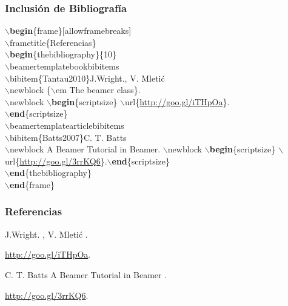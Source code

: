 \documentclass[aspectratio=43]{beamer}%
\begin{document}
\begin{frame}[fragile]
\frametitle{\textbf{Inclusión de Bibliografía}}
\justifying

$\backslash$\textbf{begin}\{frame\}[allowframebreaks]\\
$\backslash$frametitle\{Referencias\} \\
$\backslash$\textbf{begin}\{thebibliography\}\{10\}\\
$\backslash$beamertemplatebookbibitems\\
$\backslash$bibitem\{Tantau2010\}J.Wright., V. Mleti\'c\\
$\backslash$newblock \{$\backslash$em The beamer class\}.\\
$\backslash$newblock $\backslash$\textbf{begin}\{scriptsize\} $\backslash$url\{\url{http://goo.gl/iTHpOa}\}.\\
$\backslash$\textbf{end}\{scriptsize\}\\
$\backslash$beamertemplatearticlebibitems \\
$\backslash$bibitem\{Batts2007\}C. T. Batts\\
$\backslash$newblock A Beamer Tutorial in Beamer. $\backslash$newblock $\backslash$\textbf{begin}\{scriptsize\} 
$\backslash$url\{\url{http://goo.gl/3rrKQ6}\}.$\backslash$\textbf{end}\{scriptsize\}\\
$\backslash$\textbf{end}\{thebibliography\}\\
$\backslash$\textbf{end}\{frame\}

\end{frame}


\begin{frame}[allowframebreaks]
\frametitle{Referencias} 
\begin{thebibliography}{10}
\beamertemplatebookbibitems
{}J.Wright. , V. Mleti\'c
.
\newblock \begin{scriptsize} \url{http://goo.gl/iTHpOa}.\end{scriptsize}
\beamertemplatearticlebibitems 
{}C. T. Batts
\newblock A Beamer Tutorial in Beamer . \newblock \begin{scriptsize} \url{http://goo.gl/3rrKQ6}.
\end{scriptsize}
\end{thebibliography}
\end{frame}
\end{document}
